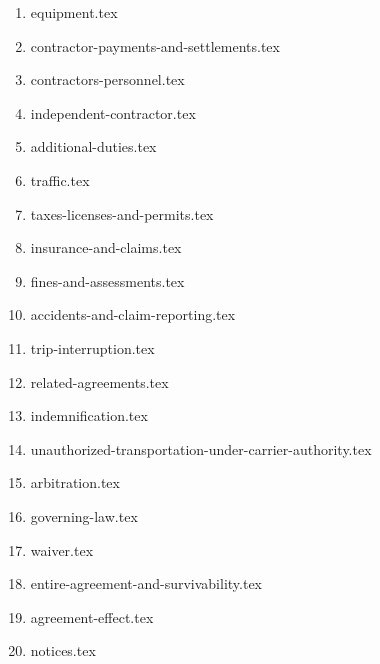 \begin{enumerate}
    \item {equipment.tex}
    \item {contractor-payments-and-settlements.tex}
    \item {contractors-personnel.tex}
    \item {independent-contractor.tex}
    \item {additional-duties.tex}
    \item {traffic.tex}
    \item {taxes-licenses-and-permits.tex}
    \item {insurance-and-claims.tex}
    \item {fines-and-assessments.tex}
    \item {accidents-and-claim-reporting.tex}
    \item {trip-interruption.tex}
    \item {related-agreements.tex}
    \item {indemnification.tex}
    \item {unauthorized-transportation-under-carrier-authority.tex}
    \item {arbitration.tex}
    \item {governing-law.tex}
    \item {waiver.tex}
    \item {entire-agreement-and-survivability.tex}
    \item {agreement-effect.tex}
    \item {notices.tex}
\end{enumerate}